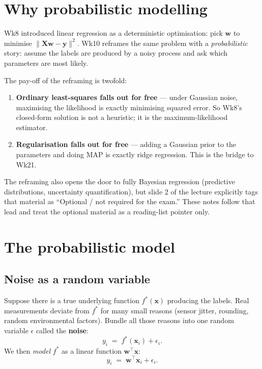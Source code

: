 \documentclass[11pt, a4paper]{article}
\begin{document}
\section{Why probabilistic modelling}

Wk8 introduced linear regression as a deterministic optimisation: pick $\mathbf{w}$ to minimise $\|\mathbf{X}\mathbf{w}-\mathbf{y}\|^2$. Wk10 reframes the same problem with a \emph{probabilistic} story: assume the labels are produced by a noisy process and ask which parameters are most likely.

The pay-off of the reframing is twofold:

\begin{enumerate}
  \item \textbf{Ordinary least-squares falls out for free} — under Gaussian noise, maximising the likelihood is exactly minimising squared error. So Wk8's closed-form solution is not a heuristic; it is the maximum-likelihood estimator.
  \item \textbf{Regularisation falls out for free} — adding a Gaussian prior to the parameters and doing MAP is exactly ridge regression. This is the bridge to Wk21.
\end{enumerate}

The reframing also opens the door to fully Bayesian regression (predictive distributions, uncertainty quantification), but slide 2 of the lecture explicitly tags that material as ``Optional / not required for the exam.'' These notes follow that lead and treat the optional material as a reading-list pointer only.

\section{The probabilistic model}

\subsection{Noise as a random variable}

Suppose there is a true underlying function $f^*(\mathbf{x})$ producing the labels. Real measurements deviate from $f^*$ for many small reasons (sensor jitter, rounding, random environmental factors). Bundle all those reasons into one random variable $\epsilon$ called the \textbf{noise}:
\[
y_i \;=\; f^*(\mathbf{x}_i) + \epsilon_i.
\]
We then \emph{model} $f^*$ as a linear function $\mathbf{w}^\top\mathbf{x}$:
\[
y_i \;=\; \mathbf{w}^\top\mathbf{x}_i + \epsilon_i.
\]
\end{document}
